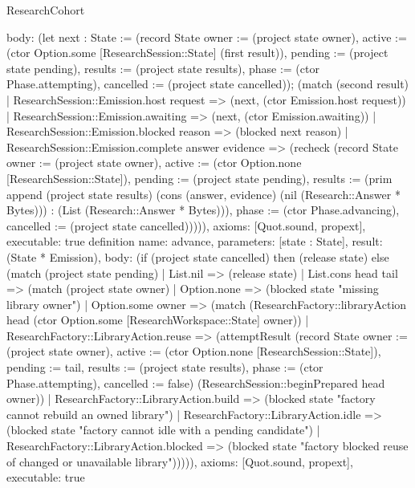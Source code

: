 \begin{lexlean}{ResearchCohort}
\begin{semanticmodule}
{ body: (let next : State := (record State {owner := (project state owner), active := (ctor Option.some [ResearchSession::State] (first result)), pending := (project state pending), results := (project state results), phase := (ctor Phase.attempting), cancelled := (project state cancelled)}); (match (second result) | ResearchSession::Emission.host request => (next, (ctor Emission.host request)) | ResearchSession::Emission.awaiting => (next, (ctor Emission.awaiting)) | ResearchSession::Emission.blocked reason => (blocked next reason) | ResearchSession::Emission.complete answer evidence => (recheck (record State {owner := (project state owner), active := (ctor Option.none [ResearchSession::State]), pending := (project state pending), results := (prim append (project state results) (cons (answer, evidence) (nil (Research::Answer * Bytes))) : (List (Research::Answer * Bytes))), phase := (ctor Phase.advancing), cancelled := (project state cancelled)})))),
 axioms: [Quot.sound, propext],
 executable: true
}
definition{
 name: advance,
 parameters: [state : State],
 result: (State * Emission),
 body: (if (project state cancelled) then (release state) else (match (project state pending) | List.nil => (release state) | List.cons head tail => (match (project state owner) | Option.none => (blocked state "missing library owner") | Option.some owner => (match (ResearchFactory::libraryAction head (ctor Option.some [ResearchWorkspace::State] owner)) | ResearchFactory::LibraryAction.reuse => (attemptResult (record State {owner := (project state owner), active := (ctor Option.none [ResearchSession::State]), pending := tail, results := (project state results), phase := (ctor Phase.attempting), cancelled := false}) (ResearchSession::beginPrepared head owner)) | ResearchFactory::LibraryAction.build => (blocked state "factory cannot rebuild an owned library") | ResearchFactory::LibraryAction.idle => (blocked state "factory cannot idle with a pending candidate") | ResearchFactory::LibraryAction.blocked => (blocked state "factory blocked reuse of changed or unavailable library"))))),
 axioms: [Quot.sound, propext],
 executable: true
}


\end{semanticmodule}
\end{lexlean}
